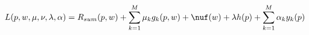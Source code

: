 \documentclass[preview]{standalone}
\begin{document}
\begin{align*}
L(p, w, \mu, \nu, \lambda, \alpha) = R_{sum}(p,w) + \sum_{k=1}^{M}\mu_k g_k(p,w) + \nuf(w) + \lambda h(p) + \sum_{k=1}^{M} {\alpha_k y_k(p)}
\end{align*}
\end{document}
